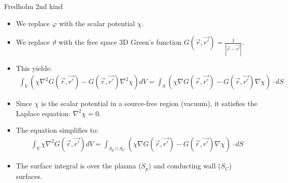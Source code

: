 \documentclass[8pt]{beamer}
\begin{document}
\begin{frame}{\color{white} Fredholm 2nd kind}
\begin{itemize}
    \item We replace $\varphi$ with the scalar potential $\chi$.
    \item We replace $\vartheta$ with the free space 3D Green's function $G(\vec{r},\vec{r'}) = \frac{1}{|\vec{r} - \vec{r'}|}$.
    \item This yields:
    \begin{align}
        \int_V \left( \chi \nabla^2 G(\vec{r},\vec{r'}) - G(\vec{r},\vec{r'}) \nabla^2 \chi \right) dV = \int_S \left( \chi \nabla G(\vec{r},\vec{r'}) - G(\vec{r},\vec{r'}) \nabla \chi \right) \cdot dS
    \end{align}
    \item Since $\chi$ is the scalar potential in a source-free region (vacuum), it satisfies the Laplace equation: $\nabla^2 \chi = 0$.
    \item The equation simplifies to:
    \begin{align}
        \int_V  \chi \nabla^2 G(\vec{r},\vec{r'})  dV = \int_{S_p \cap S_C} \left( \chi \nabla G(\vec{r},\vec{r'}) - G(\vec{r},\vec{r'}) \nabla \chi \right) \cdot dS
    \end{align}
    \item The surface integral is over the plasma ($S_p$) and conducting wall ($S_C$) surfaces.
\end{itemize}
\end{frame}
\end{document}
